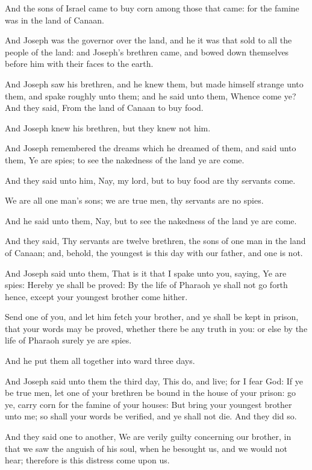 \verse And the sons of Israel came to buy corn among those that came: for the famine was in the land of Canaan.

\verse And Joseph was the governor over the land, and he it was that sold to all the people of the land: and Joseph's brethren came, and bowed down themselves before him with their faces to the earth.

\verse And Joseph saw his brethren, and he knew them, but made himself strange unto them, and spake roughly unto them; and he said unto them, Whence come ye? And they said, From the land of Canaan to buy food.

\verse And Joseph knew his brethren, but they knew not him.

\verse And Joseph remembered the dreams which he dreamed of them, and said unto them, Ye are spies; to see the nakedness of the land ye are come.

\verse And they said unto him, Nay, my lord, but to buy food are thy servants come.

\verse We are all one man's sons; we are true men, thy servants are no spies.

\verse And he said unto them, Nay, but to see the nakedness of the land ye are come.

\verse And they said, Thy servants are twelve brethren, the sons of one man in the land of Canaan; and, behold, the youngest is this day with our father, and one is not.

\verse And Joseph said unto them, That is it that I spake unto you, saying, Ye are spies: \verse Hereby ye shall be proved: By the life of Pharaoh ye shall not go forth hence, except your youngest brother come hither.

\verse Send one of you, and let him fetch your brother, and ye shall be kept in prison, that your words may be proved, whether there be any truth in you: or else by the life of Pharaoh surely ye are spies.

\verse And he put them all together into ward three days.

\verse And Joseph said unto them the third day, This do, and live; for I fear God: \verse If ye be true men, let one of your brethren be bound in the house of your prison: go ye, carry corn for the famine of your houses: \verse But bring your youngest brother unto me; so shall your words be verified, and ye shall not die. And they did so.

\verse And they said one to another, We are verily guilty concerning our brother, in that we saw the anguish of his soul, when he besought us, and we would not hear; therefore is this distress come upon us.


